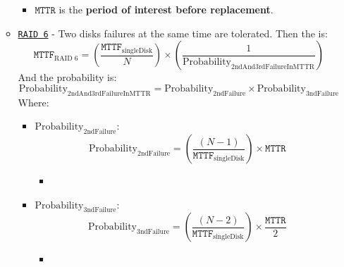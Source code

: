 \begin{itemize}
\begin{itemize}
\begin{itemize}
            \item $\texttt{MTTR}$ is the \textbf{period of interest before replacement}.
        \end{itemize}


        \item \texttt{\underline{RAID 6}} - Two disks failures at the same time are tolerated. Then the  is:
        \begin{equation}
            \texttt{MTTF}_{\text{RAID 6}} = \left(
                \dfrac{\texttt{MTTF}_{\text{singleDisk}}}{N}
            \right) \times \left(
                \dfrac{1}{\text{Probability}_{\text{2ndAnd3rdFailureInMTTR}}}
            \right)
        \end{equation}
        And the probability is:
        \begin{equation}
            \text{Probability}_{\text{2ndAnd3rdFailureInMTTR}} = \text{Probability}_{\text{2ndFailure}} \times \text{Probability}_{\text{3ndFailure}}
        \end{equation}
        Where:
        \begin{itemize}
            \item $\text{Probability}_{\text{2ndFailure}}$:
            \begin{equation}
                \text{Probability}_{\text{2ndFailure}} = \left(\dfrac{\left(N-1\right)}{\texttt{MTTF}_{\text{singleDisk}}}\right) \times \texttt{MTTR}
            \end{equation}
            \begin{itemize}
                \item 
            \end{itemize}

            \item $\text{Probability}_{\text{3ndFailure}}$:
            \begin{equation}
                \text{Probability}_{\text{3ndFailure}} = \left(\dfrac{\left(N-2\right)}{\texttt{MTTF}_{\text{singleDisk}}}\right) \times \dfrac{\texttt{MTTR}}{2}
            \end{equation}
            \begin{itemize}
                \item 
            \end{itemize}
        \end{itemize}
    \end{itemize}
\end{itemize}
